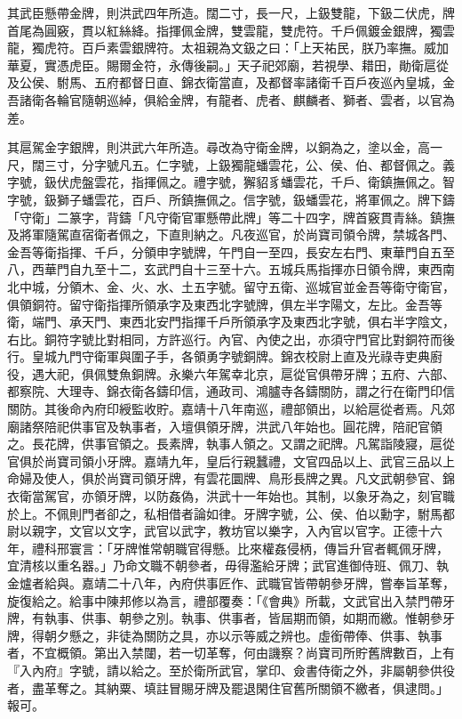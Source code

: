 其武臣懸帶金牌，則洪武四年所造。闊二寸，長一尺，上鈒雙龍，下鈒二伏虎，牌首尾為圓竅，貫以紅絲絳。指揮佩金牌，雙雲龍，雙虎符。千戶佩鍍金銀牌，獨雲龍，獨虎符。百戶素雲銀牌符。太祖親為文鈒之曰：「上天祐民，朕乃率撫。威加華夏，實憑虎臣。賜爾金符，永傳後嗣。」天子祀郊廟，若視學、耤田，勛衛扈從及公侯、駙馬、五府都督日直、錦衣衛當直，及都督率諸衛千百戶夜巡內皇城，金吾諸衛各輪官隨朝巡綽，俱給金牌，有龍者、虎者、麒麟者、獅者、雲者，以官為差。

其扈駕金字銀牌，則洪武六年所造。尋改為守衛金牌，以銅為之，塗以金，高一尺，闊三寸，分字號凡五。仁字號，上鈒獨龍蟠雲花，公、侯、伯、都督佩之。義字號，鈒伏虎盤雲花，指揮佩之。禮字號，獬貂豸蟠雲花，千戶、衛鎮撫佩之。智字號，鈒獅子蟠雲花，百戶、所鎮撫佩之。信字號，鈒蟠雲花，將軍佩之。牌下鑄「守衛」二篆字，背鑄「凡守衛官軍懸帶此牌」等二十四字，牌首竅貫青絲。鎮撫及將軍隨駕直宿衛者佩之，下直則納之。凡夜巡官，於尚寶司領令牌，禁城各門、金吾等衛指揮、千戶，分領申字號牌，午門自一至四，長安左右門、東華門自五至八，西華門自九至十二，玄武門自十三至十六。五城兵馬指揮亦日領令牌，東西南北中城，分領木、金、火、水、土五字號。留守五衛、巡城官並金吾等衛守衛官，俱領銅符。留守衛指揮所領承字及東西北字號牌，俱左半字陽文，左比。金吾等衛，端門、承天門、東西北安門指揮千戶所領承字及東西北字號，俱右半字陰文，右比。銅符字號比對相同，方許巡行。內官、內使之出，亦須守門官比對銅符而後行。皇城九門守衛軍與圍子手，各領勇字號銅牌。錦衣校尉上直及光祿寺吏典廚役，遇大祀，俱佩雙魚銅牌。永樂六年駕幸北京，扈從官俱帶牙牌；五府、六部、都察院、大理寺、錦衣衛各鑄印信，通政司、鴻臚寺各鑄關防，謂之行在衛門印信關防。其後命內府印綬監收貯。嘉靖十八年南巡，禮部領出，以給扈從者焉。凡郊廟諸祭陪祀供事官及執事者，入壇俱領牙牌，洪武八年始也。圓花牌，陪祀官領之。長花牌，供事官領之。長素牌，執事人領之。又謂之祀牌。凡駕詣陵寢，扈從官俱於尚寶司領小牙牌。嘉靖九年，皇后行親蠶禮，文官四品以上、武官三品以上命婦及使人，俱於尚寶司領牙牌，有雲花圜牌、鳥形長牌之異。凡文武朝參官、錦衣衛當駕官，亦領牙牌，以防姦偽，洪武十一年始也。其制，以象牙為之，刻官職於上。不佩則門者卻之，私相借者論如律。牙牌字號，公、侯、伯以勳字，駙馬都尉以親字，文官以文字，武官以武字，教坊官以樂字，入內官以官字。正德十六年，禮科邢寰言：「牙牌惟常朝職官得懸。比來權姦侵柄，傳旨升官者輒佩牙牌，宜清核以重名器。」乃命文職不朝參者，毋得濫給牙牌；武官進御侍班、佩刀、執金爐者給與。嘉靖二十八年，內府供事匠作、武職官皆帶朝參牙牌，嘗奉旨革奪，旋復給之。給事中陳邦修以為言，禮部覆奏：「《會典》所載，文武官出入禁門帶牙牌，有執事、供事、朝參之別。執事、供事者，皆屆期而領，如期而繳。惟朝參牙牌，得朝夕懸之，非徒為關防之具，亦以示等威之辨也。虛銜帶俸、供事、執事者，不宜概領。第出入禁闥，若一切革奪，何由譏察？尚寶司所貯舊牌數百，上有『入內府』字號，請以給之。至於衛所武官，掌印、僉書侍衛之外，非屬朝參供役者，盡革奪之。其納粟、填註冒賜牙牌及罷退閑住官舊所關領不繳者，俱逮問。」報可。

